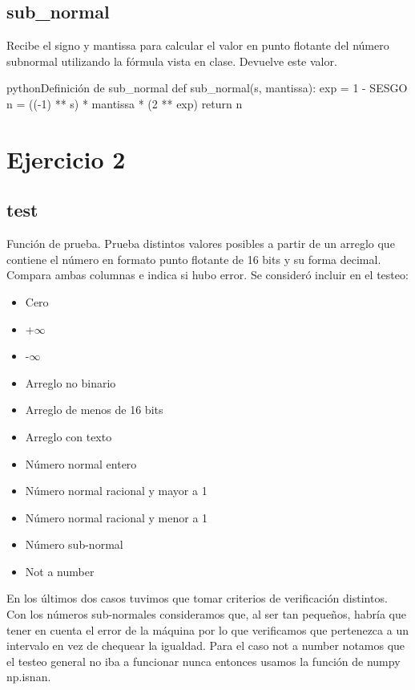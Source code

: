 	\subsection{sub\_normal}
		Recibe el signo y mantissa para calcular el valor en punto flotante del número subnormal utilizando la fórmula vista en clase. Devuelve este valor.

\begin{sourcecode}[\label{codigo-python-5}]{python}{Definición de sub\_normal}	
def sub_normal(s, mantissa):
    exp = 1 - SESGO
    n = ((-1) ** s) * mantissa * (2 ** exp)
    return n\end{sourcecode}

\section{Ejercicio 2}

	\subsection{test}
	Función de prueba. Prueba distintos valores posibles a partir de un arreglo que contiene el número en formato punto flotante de 16 bits y su forma decimal. Compara ambas columnas e indica si hubo error. Se consideró incluir en el testeo:
	
\begin{itemize}[label={--}]
				\item Cero
				\item +$\infty$
				\item -$\infty$
				\item Arreglo no binario
				\item Arreglo de menos de 16 bits
				\item Arreglo con texto
				\item Número normal entero
				\item Número normal racional y mayor a 1 
				\item Número normal racional y menor a 1
				\item Número sub-normal
				\item Not a number
			\end{itemize}	
	
En los últimos dos casos tuvimos que tomar criterios de verificación distintos. Con los números sub-normales consideramos que, al ser tan pequeños, habría que tener en cuenta el error de la máquina por lo que verificamos que pertenezca a un intervalo en vez de chequear la igualdad. Para el caso not a number notamos que el testeo general no iba a funcionar nunca entonces usamos la función de numpy np.isnan.

